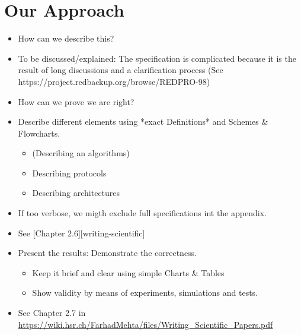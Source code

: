 \chapter{Our Approach}
\label{sec:our-approach}

\begin{itemize}
\item How can we describe this?
\item To be discussed/explained: The specification is complicated because it is the result of long discussions and a clarification process (See https://project.redbackup.org/browse/REDPRO-98)
\item How can we prove we are right?
\item Describe different elements using *exact Definitions* and Schemes \& Flowcharts.
\begin{itemize}
	\item (Describing an algorithms)
	\item Describing protocols
	\item Describing architectures
\end{itemize}
\item If too verbose, we migth exclude full specifications int the appendix.
\item See [Chapter 2.6][writing-scientific]
\item Present the results: Demonstrate the correctness.
\begin{itemize}
	\item Keep it brief and clear using simple Charts \& Tables
	\item Show validity by means of experiments, simulations and tests.
\end{itemize}
\item See Chapter 2.7 in \url{https://wiki.hsr.ch/FarhadMehta/files/Writing_Scientific_Papers.pdf}
\end{itemize}

